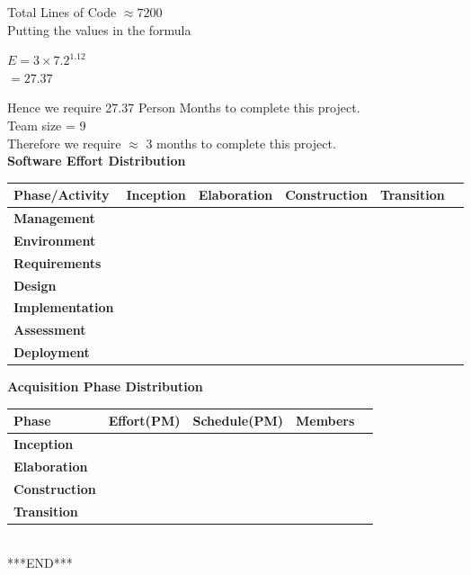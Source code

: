 \documentclass[12pt]{article}
\begin{document}
\large{Total Lines of Code $\approx 7200$}\\

Putting the values in the formula 
\begin{center}
 $E = 3 \times 7.2^{1.12}$\\
 $ = 27.37$
\end{center}

Hence we require 27.37 Person Months to complete this project.\\

\large{Team size = 9}\\

Therefore we require $\approx$ 3 months to complete this project.\\

\large{\textbf{Software Effort Distribution}}

\begin{center}
 \begin{tabular}{ | l | l | l | l | l | p{1cm} |}
    \hline
    \textbf{Phase/Activity} & \textbf{Inception} & \textbf{Elaboration} & \textbf{Construction} & \textbf{Transition}  \\ \hline
    \textbf{Management} &  &  &  & \\ \hline
    \textbf{Environment} &  &  &  &\\ \hline
    \textbf{Requirements} &  &  &  &\\\hline
    \textbf{Design} &  &  &  & \\ \hline
    \textbf{Implementation} &  &  &  & \\ \hline
    \textbf{Assessment} &  &  &  & \\ \hline
    \textbf{Deployment} &  &  &  & \\ \hline
    \end{tabular}
\end{center}
\newpage
\large{\textbf{Acquisition Phase Distribution}}

\begin{center}
 \begin{tabular}{ | l | l | l | l | p{1cm} |}
    \hline
    \textbf{Phase} & \textbf{Effort(PM)} & \textbf{Schedule(PM)} & \textbf{Members}  \\ \hline
    \textbf{Inception} &  &  &   \\ \hline
    \textbf{Elaboration} &  &  &  \\ \hline
    \textbf{Construction} &  &  &  \\\hline
    \textbf{Transition} &  &  &  \\ \hline

    \end{tabular}
    \\[2\baselineskip]
    
    ***END***
\end{center}
\end{document}
